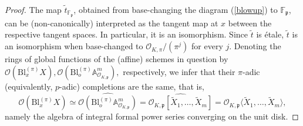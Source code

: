 \documentclass[11pt,oneside]{amsart}
\theoremstyle{plain}
\theoremstyle{definition}
\DeclareMathOperator{\spec}{Spec} \DeclareMathOperator{\sgn}{sign}
\def\F{\mathbb{F}}
\def\oh{\mathcal{O}}
\begin{document}
\begin{proof}

The map $\tilde{t}_{\F_{\mathfrak{p}}}$, obtained from base-changing the diagram (\ref{blowup}) to $\F_{\mathfrak{p}}$, can be (non-canonically) interpreted as the tangent map at $x$ between the respective tangent spaces. In particular, it is an isomorphism. Since $\tilde{t}$ is \'{e}tale, $\tilde{t}$ is an isomorphism when base-changed to ${\oh_{K, \pi}/(\pi^j)}$ for every $j$. Denoting the rings of global functions of the (affine) schemes in question by $\oh(\mathrm{Bl}_x^{(\pi)} X), \oh(\mathrm{Bl}_o^{(\pi)} \mathbb{A}^m_{\oh_{K,\mathfrak{p}}}),$ respectively, we infer that their $\pi$-adic (equivalently, $p$-adic) completions are the same, that is,
\begin{equation} \label{p-comp-iso}
\widehat{\oh(\mathrm{Bl}_x^{(\pi)} X)} \simeq \widehat{\oh(\mathrm{Bl}_o^{(\pi)} \mathbb{A}^m_{\oh_{K,\mathfrak{p}}})}=\widehat{\oh_{K, \mathfrak{p}}[\tilde{X}_1, \dots, \tilde{X}_m]}=\oh_{K, \mathfrak{p}}\langle\tilde{X}_1, \dots, \tilde{X}_m \rangle,
\end{equation}
namely the algebra of integral formal power series converging on the unit disk.  


\end{proof}
\end{document}
